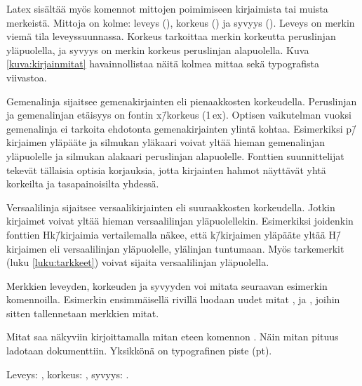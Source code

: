 Latex sisältää myös komennot mittojen poimimiseen kirjaimista tai muista
merkeistä. Mittoja on kolme: leveys (), korkeus
() ja syvyys (). Leveys on merkin
viemä tila leveyssuunnassa. Korkeus tarkoittaa merkin korkeutta
peruslinjan yläpuolella, ja syvyys on merkin korkeus peruslinjan
alapuolella. Kuva \ref{kuva:kirjainmitat} havainnollistaa näitä kolmea
mittaa sekä typografista viivastoa.

Gemenalinja sijaitsee gemenakirjainten eli pienaakkosten korkeudella.
Peruslinjan ja gemenalinjan etäisyys on fontin x\=/korkeus (1\,ex).
Optisen vaikutelman vuoksi gemenalinja ei tarkoita ehdotonta
gemenakirjainten ylintä kohtaa. Esimerkiksi p\=/kirjaimen yläpääte ja
silmukan yläkaari voivat yltää hieman gemenalinjan yläpuolelle ja
silmukan alakaari peruslinjan alapuolelle. Fonttien suunnittelijat
tekevät tällaisia optisia korjauksia, jotta kirjainten hahmot näyttävät
yhtä korkeilta ja tasapainoisilta yhdessä.

Versaalilinja sijaitsee versaalikirjainten eli suuraakkosten
korkeudella. Jotkin kirjaimet voivat yltää hieman versaalilinjan
yläpuolellekin. Esimerkiksi joidenkin fonttien Hk\=/kirjaimia
vertailemalla näkee, että k\=/kirjaimen yläpääte yltää H\=/kirjaimen eli
versaalilinjan yläpuolelle, ylälinjan tuntumaan. Myös tarkemerkit (luku
\ref{luku:tarkkeet}) voivat sijaita versaalilinjan yläpuolella.

Merkkien leveyden, korkeuden ja syvyyden voi mitata seuraavan esimerkin
komennoilla. Esimerkin ensimmäisellä rivillä luodaan uudet mitat
,  ja , joihin sitten
tallennetaan merkkien mitat.

\begin{koodilohkosis}
\newlength{\leveys} \newlength{\korkeus} \newlength{\syvyys}
\settowidth{\leveys}{abc} %
\end{koodilohkosis}

Mitat saa näkyviin kirjoittamalla mitan eteen komennon .
Näin mitan pituus ladotaan dokumenttiin. Yksikkönä on typografinen piste
(pt).

\begin{koodilohkosis}
Leveys: \the\leveys, korkeus: \the\korkeus, syvyys: \the\syvyys.
\end{koodilohkosis}

